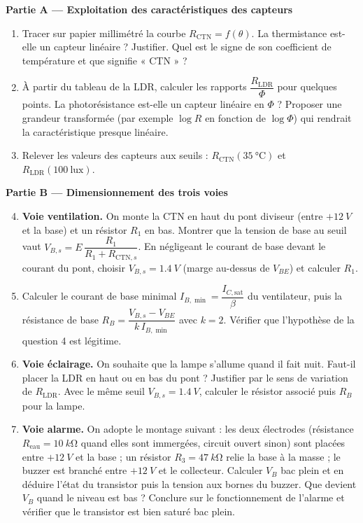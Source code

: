 \documentclass[11pt]{article}
\newcounter{popsec}
\newcounter{popsub}
\newcommand{\courssub}[1]{%
  \stepcounter{popsub}%
  \par\vspace{9pt}\noindent{\popxbold\fontsize{11.5}{13}\selectfont\color{popink}{\color{poporange}\thepopsec.\thepopsub}\hspace{6pt}#1}\par\nopagebreak\vspace{4pt}
}
\begin{document}
\courssub{Consignes}

\textbf{Partie A — Exploitation des caractéristiques des capteurs}

\begin{enumerate}
\item Tracer sur papier millimétré la courbe $R_{\text{CTN}} = f(\theta)$. La thermistance est-elle un capteur linéaire ? Justifier. Quel est le signe de son coefficient de température et que signifie « CTN » ?
\item À partir du tableau de la LDR, calculer les rapports $\dfrac{R_{\text{LDR}}}{\Phi}$ pour quelques points. La photorésistance est-elle un capteur linéaire en $\Phi$ ? Proposer une grandeur transformée (par exemple $\log R$ en fonction de $\log \Phi$) qui rendrait la caractéristique presque linéaire.
\item Relever les valeurs des capteurs aux seuils : $R_{\text{CTN}}(\SI{35}{\celsius})$ et $R_{\text{LDR}}(100\ \text{lux})$.
\end{enumerate}

\textbf{Partie B — Dimensionnement des trois voies}

\begin{enumerate}
\setcounter{enumi}{3}
\item \textbf{Voie ventilation.} On monte la CTN en haut du pont diviseur (entre $+\SI{12}{V}$ et la base) et un résistor $R_1$ en bas. Montrer que la tension de base au seuil vaut $V_{B,s} = E\,\dfrac{R_1}{R_1 + R_{\text{CTN},s}}$. En négligeant le courant de base devant le courant du pont, choisir $V_{B,s} = \SI{1,4}{V}$ (marge au-dessus de $V_{BE}$) et calculer $R_1$.
\item Calculer le courant de base minimal $I_{B,\min} = \dfrac{I_{C,\text{sat}}}{\beta}$ du ventilateur, puis la résistance de base $R_B = \dfrac{V_{B,s} - V_{BE}}{k\,I_{B,\min}}$ avec $k = 2$. Vérifier que l'hypothèse de la question 4 est légitime.
\item \textbf{Voie éclairage.} On souhaite que la lampe s'allume quand il fait nuit. Faut-il placer la LDR en haut ou en bas du pont ? Justifier par le sens de variation de $R_{\text{LDR}}$. Avec le même seuil $V_{B,s} = \SI{1,4}{V}$, calculer le résistor associé puis $R_B$ pour la lampe.
\item \textbf{Voie alarme.} On adopte le montage suivant : les deux électrodes (résistance $R_{\text{eau}} = \SI{10}{k\ohm}$ quand elles sont immergées, circuit ouvert sinon) sont placées entre $+\SI{12}{V}$ et la base ; un résistor $R_3 = \SI{47}{k\ohm}$ relie la base à la masse ; le buzzer est branché entre $+\SI{12}{V}$ et le collecteur. Calculer $V_B$ bac plein et en déduire l'état du transistor puis la tension aux bornes du buzzer. Que devient $V_B$ quand le niveau est bas ? Conclure sur le fonctionnement de l'alarme et vérifier que le transistor est bien saturé bac plein.
\end{enumerate}
\end{document}
